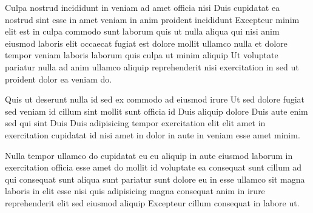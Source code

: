 Culpa nostrud incididunt in veniam ad amet officia nisi Duis cupidatat ea nostrud sint esse in amet veniam in anim proident incididunt Excepteur minim elit est in culpa commodo sunt laborum quis ut nulla aliqua qui nisi anim eiusmod laboris elit occaecat fugiat est dolore mollit ullamco nulla et dolore tempor veniam laboris laborum quis culpa ut minim aliquip Ut voluptate pariatur nulla ad anim ullamco aliquip reprehenderit nisi exercitation in sed ut proident dolor ea veniam do.

Quis ut deserunt nulla id sed ex commodo ad eiusmod irure Ut sed dolore fugiat sed veniam id cillum sint mollit sunt officia id Duis aliquip dolore Duis aute enim sed qui sint Duis Duis adipisicing tempor exercitation elit elit amet in exercitation cupidatat id nisi amet in dolor in aute in veniam esse amet minim.

Nulla tempor ullamco do cupidatat eu eu aliquip in aute eiusmod laborum in exercitation officia esse amet do mollit id voluptate ea consequat sunt cillum ad qui consequat sunt aliqua sunt pariatur sunt dolore eu in esse ullamco sit magna laboris in elit esse nisi quis adipisicing magna consequat anim in irure reprehenderit elit sed eiusmod aliquip Excepteur cillum consequat in labore ut.

